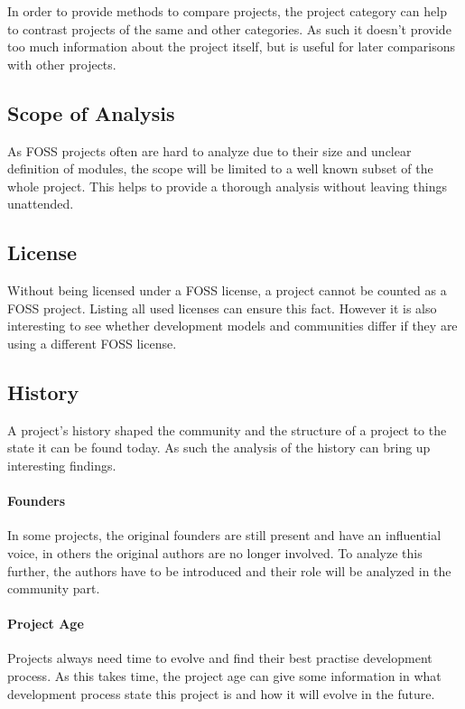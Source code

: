 In order to provide methods to compare projects, the project category can help
to contrast projects of the same and other categories. As such it doesn't
provide too much information about the project itself, but is useful for later
comparisons with other projects.

\subsection{Scope of Analysis}

As \ac{FOSS} projects often are hard to analyze due to their size and unclear
definition of modules, the scope will be limited to a well known subset of the
whole project. This helps to provide a thorough analysis without leaving things
unattended.

\subsection{License}

Without being licensed under a \ac{FOSS} license, a project cannot be counted
as a \ac{FOSS} project. Listing all used licenses can ensure this fact. However
it is also interesting to see whether development models and communities differ
if they are using a different \ac{FOSS} license.

\subsection{History}

A project's history shaped the community and the structure of a project to the
state it can be found today. As such the analysis of the history can bring up
interesting findings.

\paragraph{Founders}

In some projects, the original founders are still present and have an
influential voice, in others the original authors are no longer involved. To
analyze this further, the authors have to be introduced and their role will be
analyzed in the community part.

\paragraph{Project Age}

Projects always need time to evolve and find their best practise development
process. As this takes time, the project age can give some information in what
development process state this project is and how it will evolve in the future.

